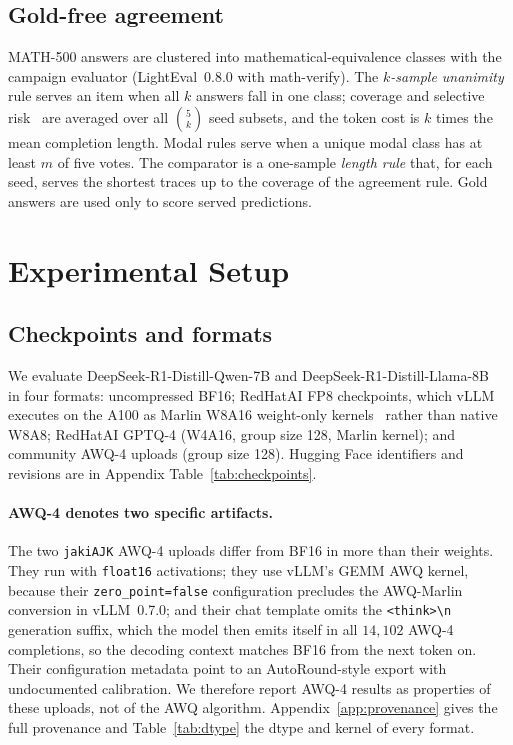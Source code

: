 \documentclass[11pt,a4paper]{article}
\begin{document}
\subsection{Gold-free agreement}
\label{sec:modal-def}
MATH-500 answers are clustered into mathematical-equivalence classes with the campaign evaluator (LightEval~0.8.0 with math-verify). The \emph{$k$-sample unanimity} rule serves an item when all $k$ answers fall in one class; coverage and selective risk~\cite{geifman2017selective} are averaged over all $\binom{5}{k}$ seed subsets, and the token cost is $k$ times the mean completion length. Modal rules serve when a unique modal class has at least $m$ of five votes. The comparator is a one-sample \emph{length rule} that, for each seed, serves the shortest traces up to the coverage of the agreement rule. Gold answers are used only to score served predictions.

\section{Experimental Setup}
\label{sec:setup}
\subsection{Checkpoints and formats}
\label{sec:setup-models}
We evaluate DeepSeek-R1-Distill-Qwen-7B and DeepSeek-R1-Distill-Llama-8B~\cite{guo2025deepseekr1} in four formats: uncompressed BF16; RedHatAI FP8 checkpoints, which vLLM executes on the A100 as Marlin W8A16 weight-only kernels~\cite{frantar2024marlin} rather than native W8A8; RedHatAI GPTQ-4 (W4A16, group size 128, Marlin kernel); and community AWQ-4 uploads (group size 128). Hugging Face identifiers and revisions are in Appendix Table~\ref{tab:checkpoints}.

\paragraph{AWQ-4 denotes two specific artifacts.} The two \texttt{jakiAJK} AWQ-4 uploads differ from BF16 in more than their weights. They run with \texttt{float16} activations; they use vLLM's GEMM AWQ kernel, because their \texttt{zero\_point=false} configuration precludes the AWQ-Marlin conversion in vLLM~0.7.0; and their chat template omits the \texttt{<think>\textbackslash n} generation suffix, which the model then emits itself in all $14{,}102$ AWQ-4 completions, so the decoding context matches BF16 from the next token on. Their configuration metadata point to an AutoRound-style export with undocumented calibration. We therefore report AWQ-4 results as properties of these uploads, not of the AWQ algorithm. Appendix~\ref{app:provenance} gives the full provenance and Table~\ref{tab:dtype} the dtype and kernel of every format.
\end{document}
